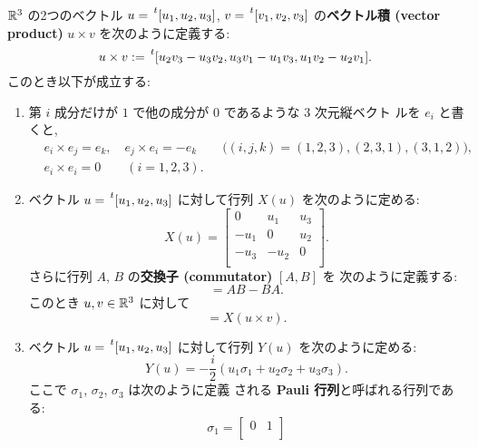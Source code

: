 \documentclass[12pt,twoside]{jarticle}
\begin{document}
\begin{question}[ベクトル積の定義, 15点]
  \label{q:def-vp}
  ${\mathbb R}^3$ の2つのベクトル $u=\tp{[u_1,u_2,u_3]}$, $v=\tp{[v_1,v_2,v_3]}$ 
  の{\bf ベクトル積 (vector product)} $u\times v$ を次のように定義する:
  \begin{equation*}
    u\times v :=
    \tp{[
      u_2 v_3 - u_3 v_2,
      u_3 v_1 - u_1 v_3,
      u_1 v_2 - u_2 v_1
    ]}.
  \end{equation*}
  このとき以下が成立する:
  \begin{enumerate}
  \item 第 $i$ 成分だけが $1$ で他の成分が $0$ であるような $3$ 次元縦ベクト
  ルを $e_i$ と書くと,
  \begin{align*}
    &
    e_i \times e_j = e_k, \quad  e_j \times e_i = -e_k
    \qquad \bigl((i,j,k)=(1,2,3),(2,3,1),(3,1,2)\bigr),
    \\ &
    e_i\times e_i = 0 \qquad (i=1,2,3).
  \end{align*}
  \item ベクトル $u=\tp{[u_1,u_2,u_3]}$ に対して行列 $X(u)$ を次のように定める:
    \begin{equation*}
      X(u) =
      \begin{bmatrix}
         0   &  u_1 & u_3 \\
        -u_1 &  0   & u_2 \\
        -u_3 & -u_2 & 0   \\
      \end{bmatrix}.
    \end{equation*}
    さらに行列 $A$, $B$ の{\bf 交換子 (commutator)} $[A,B]$ を
    次のように定義する:
    \begin{equation*}
      [A,B] = AB - BA.
    \end{equation*}
    このとき $u,v\in{\mathbb R}^3$ に対して
    \begin{equation*}
      [X(u), X(v)] = X(u\times v).
    \end{equation*}
  \item ベクトル $u=\tp{[u_1,u_2,u_3]}$ に対して行列 $Y(u)$ を次のように定める:
    \begin{equation*}
      Y(u) = -\frac{i}{2}(u_1\sigma_1 + u_2\sigma_2 + u_3\sigma_3).
    \end{equation*}
    ここで $\sigma_1$, $\sigma_2$, $\sigma_3$ は次のように定義
    される {\bf Pauli 行列}と呼ばれる行列である:
    \begin{equation*}
      \sigma_1=
      \begin{bmatrix}
        0 & 1 \\

\end{bmatrix}
\end{equation*}
\end{enumerate}
\end{question}
\end{document}
